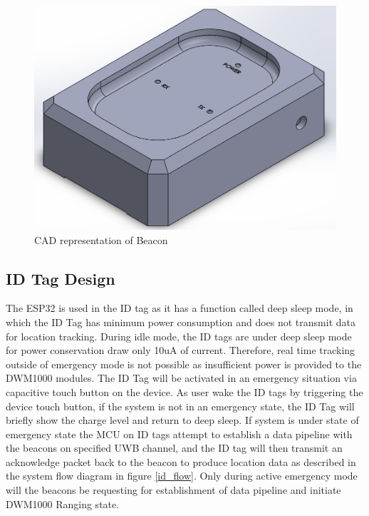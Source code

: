 \bigskip
\begin{figure}[H]
\centering
    \includegraphics[width=\linewidth]{./images/Beacon.png}
    \caption{CAD representation of Beacon}
    \label{Bcn_CAD}
\end{figure}



\pagebreak
\subsection{ID Tag Design}
The ESP32 is used in the ID tag as it has a function called deep sleep mode, in which the ID Tag has minimum power consumption and does not transmit data for location tracking. During idle mode, the ID tags are under deep sleep mode for power conservation draw only 10uA of current. Therefore, real time tracking outside of emergency mode is not possible as insufficient power is provided to the DWM1000 modules. The ID Tag will be activated in an emergency situation via capacitive touch button on the device. As user wake the ID tags by triggering the device touch button, if the system is not in an emergency state, the ID Tag will briefly show the charge level and return to deep sleep. If system is under state of emergency state the MCU on ID tags attempt to establish a data pipeline with the beacons on specified UWB channel, and the ID tag will then transmit an acknowledge packet back to the beacon to produce location data as described in the system flow diagram in figure \ref{id_flow}. Only during active emergency mode will the beacons be requesting for establishment of data pipeline and initiate DWM1000 Ranging state.

